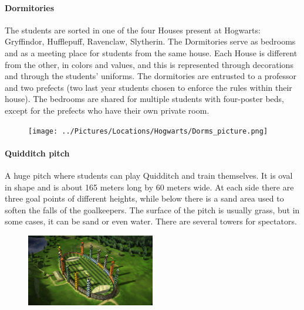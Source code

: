 
\paragraph{Dormitories}
The students are sorted in one of the four Houses present at Hogwarts: Gryffindor, Hufflepuff, Ravenclaw, Slytherin. The Dormitories serve as bedrooms and as a meeting place for students from the same house. Each House is different from the other, in colors and values, and this is represented through decorations and through the students' uniforms.  The dormitories are entrusted to a professor and two prefects (two last year students chosen to enforce the rules within their house). The bedrooms are shared for multiple students with four-poster beds, except for the prefects who have their own private room.
\begin{figure}
\centering
\texttt{[image: ../Pictures/Locations/Hogwarts/Dorms\_picture.png]}
\end{figure}

\paragraph{Quidditch pitch}
A huge pitch where students can play Quidditch and train themselves. It is oval in shape and is about 165 meters long by 60 meters wide. At each side there are three goal points of different heights, while below there is a sand area used to soften the falls of the goalkeepers. The surface of the pitch is usually grass, but in some cases, it can be sand or even water. There are several towers for spectators.
\begin{figure}
\centering
\includegraphics[max width=0.5\textwidth]{../Pictures/Locations/Hogwarts/Quidditch_Field_picture.jpg} 
\end{figure}

